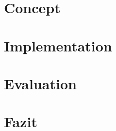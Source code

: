 \documentclass[12pt,a4paper,twoside]{report}
\theoremstyle{definition}
\begin{document}
	\chapter{Concept}
	\label{ch:Konzept}  	
		
    \cleardoublepage    
    
    \chapter{Implementation}
    \label{ch:implementierung}   
   		
   		
    \chapter{Evaluation}
	\label{ch:Bewertung}  
		
    \cleardoublepage    

    \chapter{Fazit}
    \label{ch:Fazit}    
    	
    \cleardoublepage
    

\nocite{Tompson2014, Yuan2017, Sun2015, Yuan2017b, GarciaHernando2017, Yuan2017c}

%


		
		\cleardoublepage
    \appendix

%    
		\cleardoublepage

    \listoftables
    	\cleardoublepage
    \listoffigures
    	\cleardoublepage
    \printindex
    	\cleardoublepage
    \printnomenclature
    \renewcommand{\leftmark}{\uppercase{Abkürzungsverzeichnis}}
    	\cleardoublepage
\end{document}
